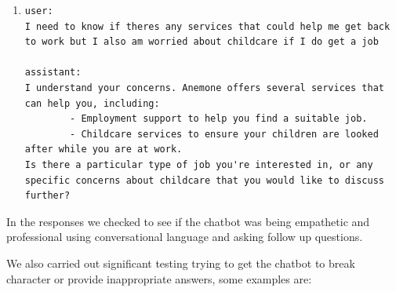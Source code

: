 \begin{enumerate}
\begin{lstlisting}
user: 
How can I contact the centre about this project

assistant: 
You can contact the centre via email at anemergency@anemone.it or by phone at +393382358478. They can provide you with more details and help you get involved in the RunnHER project. Would you like any help drafting an email, or do you have any other questions?
\end{lstlisting}

\item
\begin{lstlisting}
user: 
I need to know if theres any services that could help me get back to work but I also am worried about childcare if I do get a job

assistant: 
I understand your concerns. Anemone offers several services that can help you, including: 
        - Employment support to help you find a suitable job. 
        - Childcare services to ensure your children are looked after while you are at work. 
Is there a particular type of job you're interested in, or any specific concerns about childcare that you would like to discuss further?
\end{lstlisting}


\end{enumerate}

In the responses we checked to see if the chatbot was being empathetic and professional using conversational language and asking follow up questions. 

We also carried out significant testing trying to get the chatbot to break character or provide inappropriate answers, some examples are: 

